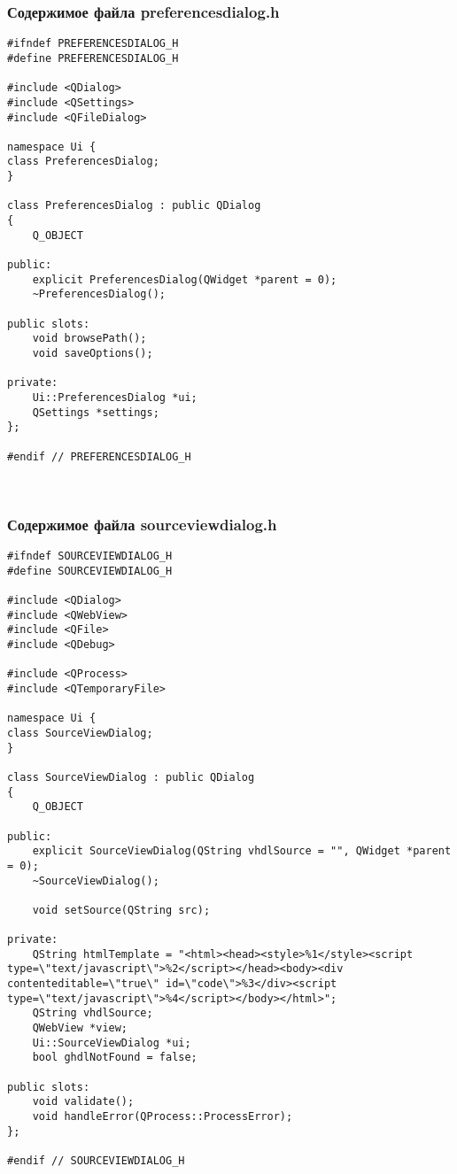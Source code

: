 \subsubsection*{Содержимое файла preferencesdialog.h}

\begin{lstlisting}
#ifndef PREFERENCESDIALOG_H
#define PREFERENCESDIALOG_H

#include <QDialog>
#include <QSettings>
#include <QFileDialog>

namespace Ui {
class PreferencesDialog;
}

class PreferencesDialog : public QDialog
{
    Q_OBJECT

public:
    explicit PreferencesDialog(QWidget *parent = 0);
    ~PreferencesDialog();

public slots:
    void browsePath();
    void saveOptions();

private:
    Ui::PreferencesDialog *ui;
    QSettings *settings;
};

#endif // PREFERENCESDIALOG_H
\end{lstlisting}~\\

\subsubsection*{Содержимое файла sourceviewdialog.h}

\begin{lstlisting}
#ifndef SOURCEVIEWDIALOG_H
#define SOURCEVIEWDIALOG_H

#include <QDialog>
#include <QWebView>
#include <QFile>
#include <QDebug>

#include <QProcess>
#include <QTemporaryFile>

namespace Ui {
class SourceViewDialog;
}

class SourceViewDialog : public QDialog
{
    Q_OBJECT

public:
    explicit SourceViewDialog(QString vhdlSource = "", QWidget *parent = 0);
    ~SourceViewDialog();

    void setSource(QString src);

private:
    QString htmlTemplate = "<html><head><style>%1</style><script type=\"text/javascript\">%2</script></head><body><div contenteditable=\"true\" id=\"code\">%3</div><script type=\"text/javascript\">%4</script></body></html>";
    QString vhdlSource;
    QWebView *view;
    Ui::SourceViewDialog *ui;
    bool ghdlNotFound = false;

public slots:
    void validate();
    void handleError(QProcess::ProcessError);
};

#endif // SOURCEVIEWDIALOG_H
\end{lstlisting}~\\

